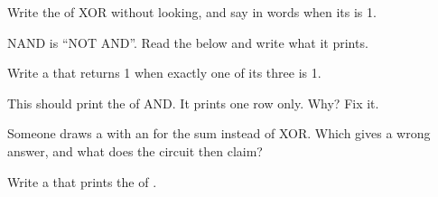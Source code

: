 \begin{exercise}[$\star$]\label{exo:g9:logic-gates:2}
Write the  of XOR without looking, and say in words when its 
is 1.
\end{exercise}

\begin{exercise}[$\star$]\label{exo:g9:logic-gates:3}
NAND is ``NOT AND''. Read the  below and write what it prints.

\label{lst:g9:logic-gates:nand}
\end{exercise}

\begin{exercise}[$\star$]\label{exo:g9:logic-gates:4}
Write a   that returns 1 when exactly one of
its three  is 1.
\end{exercise}

\begin{exercise}[$\star\star$]\label{exo:g9:logic-gates:5}
This  should print the  of AND. It prints one row only. Why?
Fix it.

\label{lst:g9:logic-gates:table-bug}
\end{exercise}

\begin{exercise}[$\star\star$]\label{exo:g9:logic-gates:6}
Someone draws a  with an  for the sum  instead of XOR.
Which  gives a wrong answer, and what does the circuit then claim?
\end{exercise}

\begin{exercise}[$\star\star$]\label{exo:g9:logic-gates:7}
Write a  that prints the  of
.
\end{exercise}

